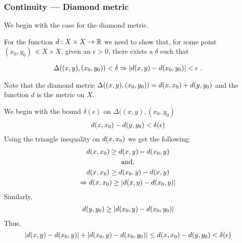 \begin{frame}
    \frametitle{Continuity --- Diamond metric}

    We begin with the case for the
    diamond metric.

    \pause

    For the function \(d: X\times X \to \mathbb{R}\) we need to show that, for some point \((x_0, y_0)\ \in X\times X \),
    given an \(\epsilon > 0\), there exists a \(\delta\) such that 

    \begin{gather}
        \Delta((x, y), (x_0, y_0)) < \delta \Rightarrow |d(x, y) - d(x_0, y_0)| < \epsilon~.
    \end{gather}

    Note that the diamond metric \(\Delta((x, y), (x_0, y_0)) = d(x, x_0) + d(y, y_0)\)
    and the function \(d\) is the metric on \(X\).

    
\end{frame}

\begin{frame}
    We begin with the bound \(\delta(\epsilon)\) on \(\Delta((x, y), (x_0, y_0)\) 
    \begin{gather*}
        d(x, x_0) - d(y, y_0) < \delta(\epsilon)
    \end{gather*}
    \pause
    Using the triangle inequality on \(d(x, x_0)\) we get the following:
    \begin{gather*}
        d(x, x_0) \geq d(x, y) - d(x_0, y) \\
        \text{and,}\\ d(x, x_0) \geq d(x_0, y) - d(x, y) \\
        \Rightarrow d(x, x_0) \geq |d(x, y) - d(x_0, y)| 
    \end{gather*}
    \pause
    Similarly,
    \begin{gather*}
        d(y, y_0) \geq |d(x_0, y) - d(x_0, y_0)|
    \end{gather*}
    \pause
    Thus,
    \begin{equation*}
        |d(x, y) - d(x_0, y)| + |d(x_0, y) - d(x_0, y_0)| \leq d(x, x_0) - d(y, y_0) < \delta(\epsilon)
    \end{equation*}
\end{frame}

